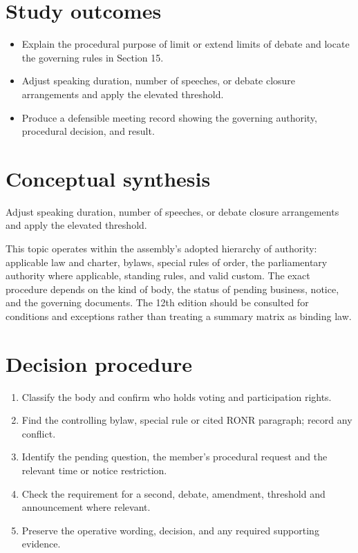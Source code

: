 \documentclass[11pt]{article}
\begin{document}
\SuiteOpen
{}
\section{Study outcomes}
\begin{itemize}[leftmargin=*,itemsep=4pt]
\item Explain the procedural purpose of limit or extend limits of debate and locate the governing rules in Section 15.
\item Adjust speaking duration, number of speeches, or debate closure arrangements and apply the elevated threshold.
\item Produce a defensible meeting record showing the governing authority, procedural decision, and result.
\end{itemize}

\section{Conceptual synthesis}
Adjust speaking duration, number of speeches, or debate closure arrangements and apply the elevated threshold.

This topic operates within the assembly’s adopted hierarchy of authority: applicable law and charter, bylaws, special rules of order, the parliamentary authority where applicable, standing rules, and valid custom. The exact procedure depends on the kind of body, the status of pending business, notice, and the governing documents. The 12th edition should be consulted for conditions and exceptions rather than treating a summary matrix as binding law.
\section{Decision procedure}
\begin{enumerate}[leftmargin=*,itemsep=4pt]
\item Classify the body and confirm who holds voting and participation rights.
\item Find the controlling bylaw, special rule or cited RONR paragraph; record any conflict.
\item Identify the pending question, the member’s procedural request and the relevant time or notice restriction.
\item Check the requirement for a second, debate, amendment, threshold and announcement where relevant.
\item Preserve the operative wording, decision, and any required supporting evidence.
\end{enumerate}
\end{document}

